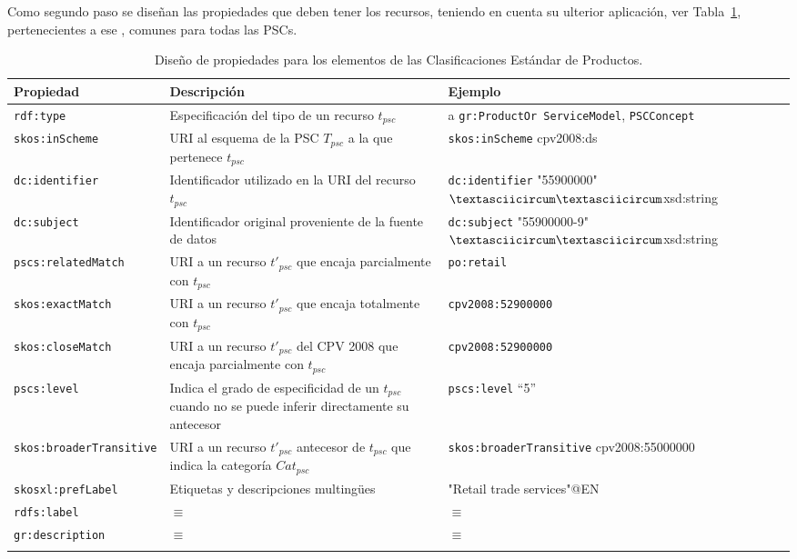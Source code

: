 Como segundo paso se diseñan las propiedades que deben tener los recursos, teniendo en cuenta su ulterior aplicación, 
ver Tabla~\ref{table:pscs-rdf-model}, pertenecientes a ese \dataset, comunes para todas las \gls{PSC}s.

\begin{longtable}[c]{|p{5cm}|p{4.5cm}|p{5cm}|} 
\hline
  \textbf{Propiedad} &  \textbf{Descripción} & \textbf{Ejemplo} \\\hline
  \texttt{rdf:type} & Especificación del tipo de un recurso $t_{psc}$ & a \texttt{gr:ProductOr ServiceModel}, \texttt{PSCConcept} \\ \hline
  \texttt{skos:inScheme} & \gls{URI} al esquema de la PSC $T_{psc}$ a la que pertenece $t_{psc}$ & \texttt{skos:inScheme} cpv2008:ds \\ \hline
  \texttt{dc:identifier} & Identificador utilizado en la URI del recurso $t_{psc}$ &  \texttt{dc:identifier} "55900000"$\textasciicircum\textasciicircum$xsd:string \\ \hline
  \texttt{dc:subject} & Identificador original proveniente de la fuente de datos &  \texttt{dc:subject} "55900000-9"$\textasciicircum\textasciicircum$xsd:string \\ \hline
  \texttt{pscs:relatedMatch} & URI a un recurso $t'_{psc}$ que encaja parcialmente con $t_{psc}$ & \texttt{po:retail} \\ \hline
  \texttt{skos:exactMatch } & URI a un recurso $t'_{psc}$ que encaja totalmente con $t_{psc}$ & \texttt{cpv2008:52900000} \\ \hline
  \texttt{skos:closeMatch } & URI a un recurso $t'_{psc}$ del CPV 2008 que encaja parcialmente con $t_{psc}$ & \texttt{cpv2008:52900000} \\ \hline
  \texttt{pscs:level} & Indica el grado de especificidad de un $t_{psc}$ cuando no se puede inferir directamente su antecesor & \texttt{pscs:level} ``5'' \\ \hline  
  \texttt{skos:broaderTransitive} & URI a un recurso $t'_{psc}$ antecesor de $t_{psc}$ que indica la categoría $Cat_{psc}$ & \texttt{skos:broaderTransitive} cpv2008:55000000 \\ \hline
  \texttt{skosxl:prefLabel} & Etiquetas y descripciones multing\"{u}es &  "Retail trade services"@EN \\ \hline
  \texttt{rdfs:label} & $\equiv$ &  $\equiv$\\ \hline
  \texttt{gr:description} & $\equiv$ &  $\equiv$ \\ \hline
\endhead
\hline
\caption{Diseño de propiedades para los elementos de las Clasificaciones Estándar de Productos.}\label{table:pscs-rdf-model}\\    
\end{longtable}


